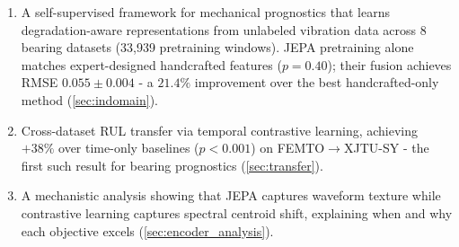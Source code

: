 \begin{enumerate}[nosep]
  \item A self-supervised framework for mechanical prognostics that learns degradation-aware representations from unlabeled vibration data across 8 bearing datasets (33,939 pretraining windows). JEPA pretraining alone matches expert-designed handcrafted features ($p = 0.40$); their fusion achieves RMSE $0.055 \pm 0.004$ - a $21.4\%$ improvement over the best handcrafted-only method (\cref{sec:indomain}).

  \item Cross-dataset RUL transfer via temporal contrastive learning, achieving $+38\%$ over time-only baselines ($p < 0.001$) on FEMTO$\to$XJTU-SY - the first such result for bearing prognostics (\cref{sec:transfer}).

  \item A mechanistic analysis showing that JEPA captures waveform texture while contrastive learning captures spectral centroid shift, explaining when and why each objective excels (\cref{sec:encoder_analysis}).
\end{enumerate}
